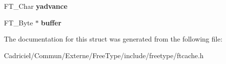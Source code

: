 \begin{DoxyCompactItemize}
\item 
F\+T\+\_\+\+Char {\bfseries yadvance}\hypertarget{struct_f_t_c___s_bit_rec___aabe767ddaf7ff62918886c6f62e9ac28}{}\label{struct_f_t_c___s_bit_rec___aabe767ddaf7ff62918886c6f62e9ac28}

\item 
F\+T\+\_\+\+Byte $\ast$ {\bfseries buffer}\hypertarget{struct_f_t_c___s_bit_rec___abe4d78fc3f411d67e7fc43f7aa21bd1d}{}\label{struct_f_t_c___s_bit_rec___abe4d78fc3f411d67e7fc43f7aa21bd1d}

\end{DoxyCompactItemize}


The documentation for this struct was generated from the following file\+:\begin{DoxyCompactItemize}
\item 
Cadriciel/\+Commun/\+Externe/\+Free\+Type/include/freetype/ftcache.\+h\end{DoxyCompactItemize}
